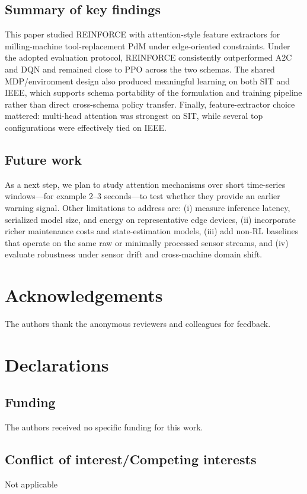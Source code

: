 \documentclass[sn-basic]{sn-jnl} %
\begin{document}
\subsection{Summary of key findings}
This paper studied \textsc{REINFORCE} with attention-style feature extractors for milling-machine tool-replacement PdM under edge-oriented constraints. Under the adopted evaluation protocol, \textsc{REINFORCE} consistently outperformed \textsc{A2C} and \textsc{DQN} and remained close to \textsc{PPO} across the two schemas. The shared MDP/environment design also produced meaningful learning on both SIT and IEEE, which supports schema portability of the formulation and training pipeline rather than direct cross-schema policy transfer. Finally, feature-extractor choice mattered: multi-head attention was strongest on SIT, while several top configurations were effectively tied on IEEE.

\subsection{Future work}
As a next step, we plan to study attention mechanisms over short time-series windows---for example 2--3 seconds---to test whether they provide an earlier warning signal. Other limitations to address are: (i) measure inference latency, serialized model size, and energy on representative edge devices, (ii) incorporate richer maintenance costs and state-estimation models, (iii) add non-RL baselines that operate on the same raw or minimally processed sensor streams, and (iv) evaluate robustness under sensor drift and cross-machine domain shift.


\section*{Acknowledgements}
The authors thank the anonymous reviewers and colleagues for feedback.

\section*{Declarations}

\subsection*{Funding}
The authors received no specific funding for this work.

\subsection*{Conflict of interest/Competing interests}
Not applicable
\end{document}
